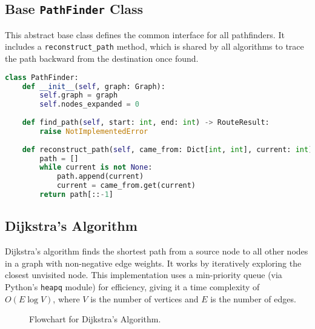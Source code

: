 \documentclass[12pt, a4paper]{report}
\begin{document}
\subsection{Base \texttt{PathFinder} Class}
This abstract base class defines the common interface for all pathfinders. It includes a \texttt{reconstruct\_path} method, which is shared by all algorithms to trace the path backward from the destination once found.
\begin{lstlisting}[language=Python, caption={Base `PathFinder` Class}, label={lst:pathfinder_base}]
class PathFinder:
    def __init__(self, graph: Graph):
        self.graph = graph
        self.nodes_expanded = 0
        
    def find_path(self, start: int, end: int) -> RouteResult:
        raise NotImplementedError
        
    def reconstruct_path(self, came_from: Dict[int, int], current: int) -> List[int]:
        path = []
        while current is not None:
            path.append(current)
            current = came_from.get(current)
        return path[::-1]
\end{lstlisting}

\subsection{Dijkstra's Algorithm}
Dijkstra's algorithm finds the shortest path from a source node to all other nodes in a graph with non-negative edge weights. It works by iteratively exploring the closest unvisited node. This implementation uses a min-priority queue (via Python's \texttt{heapq} module) for efficiency, giving it a time complexity of $O(E \log V)$, where $V$ is the number of vertices and $E$ is the number of edges.

\begin{figure}[h!]
    \centering
    \fbox{\rule{0pt}{3in}\rule{0.9\linewidth}{0pt}}
    \caption{Flowchart for Dijkstra's Algorithm.}
    \label{fig:dijkstra_flow}
\end{figure}
\end{document}
